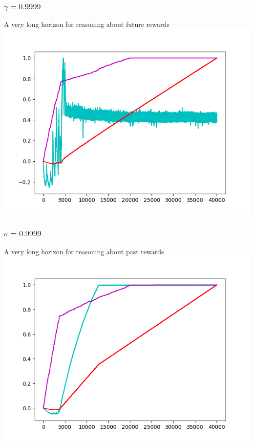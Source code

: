 \documentclass{article}
\begin{document}
\subsubsection{$\gamma = 0.9999$}
A very long horizon for reasoning about future rewards\\
\includegraphics{borgies_gamma9999.png}

\subsubsection{$\sigma=0.9999$}
A very long horizon for reasoning about past rewards\\
\includegraphics{borgies_sigma9999.png}
\end{document}
